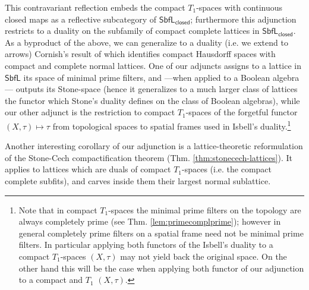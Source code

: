 \documentclass{article}
\theoremstyle{plain}
\theoremstyle{definition}
\theoremstyle{remark}
\newcommand{\bool}[1]{\mathsf{#1}}
\newcommand{\0}{\mathbbm 0}
\newcommand{\1}{\mathbbm 1}
\newcommand{\2}{\mathbbm 2}
\begin{document}

This contravariant reflection embeds the compact $T_1$-spaces with continuous closed maps as a reflective subcategory of $\bool{SbfL}_\bool{closed}$; furthermore this adjunction restricts to a duality on the subfamily of compact complete lattices in $\bool{SbfL}_\bool{closed}$.
As a byproduct of the above, we can generalize to a duality (i.e. we extend to arrows) Cornish's result of \cite{Cornish1972NormalL} which identifies compact Hausdorff spaces with compact and complete normal lattices.
One of our adjuncts assigns to a lattice in $\bool{SbfL}$ its space of minimal prime filters, and ---when applied to a Boolean algebra--- outputs its Stone-space (hence it generalizes to a much larger class of lattices the functor which Stone's duality defines on the class of Boolean algebras), while our other adjunct is the restriction to compact $T_1$-spaces of the forgetful functor $(X,\tau)\mapsto\tau$ from topological spaces to spatial frames used in Isbell's duality.\footnote{Note that in compact $T_1$-spaces the minimal prime filters on the topology are always completely prime (see Thm. \ref{lem:primecomplprime}); however in general completely prime filters on a spatial frame need not be minimal prime filters. In particular applying both functors of the Isbell's duality to a compact $T_1$-spaces $(X,\tau)$ may not yield back the original space. On the other hand this will be the case when applying both functor of our adjunction to a compact and $T_1$ $(X,\tau)$.}

Another interesting corollary of our adjunction is a lattice-theoretic reformulation of the Stone-Cech compactification theorem (Thm. \ref{thm:stonecech-lattices}). It applies to lattices which are duals of compact $T_1$-spaces (i.e. the compact complete subfits), and carves inside them their largest normal sublattice.
\end{document}
